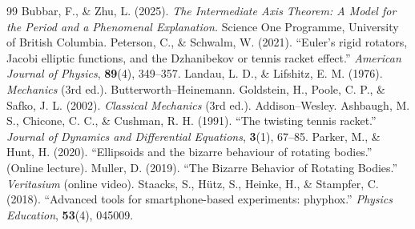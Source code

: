 \documentclass[11pt,letterpaper]{article}
\begin{document}
\begin{thebibliography}{99}
Bubbar, F., \& Zhu, L. (2025).
\textit{The Intermediate Axis Theorem: A Model for the Period and a Phenomenal
Explanation.} Science One Programme, University of British Columbia.
Peterson, C., \& Schwalm, W. (2021).
``Euler's rigid rotators, Jacobi elliptic functions, and the Dzhanibekov or
tennis racket effect.'' \textit{American Journal of Physics}, \textbf{89}(4),
349--357.
Landau, L. D., \& Lifshitz, E. M. (1976).
\textit{Mechanics} (3rd ed.). Butterworth--Heinemann.
Goldstein, H., Poole, C. P., \& Safko, J. L. (2002).
\textit{Classical Mechanics} (3rd ed.). Addison--Wesley.
Ashbaugh, M. S., Chicone, C. C., \& Cushman, R. H. (1991).
``The twisting tennis racket.'' \textit{Journal of Dynamics and Differential
Equations}, \textbf{3}(1), 67--85.
Parker, M., \& Hunt, H. (2020).
``Ellipsoids and the bizarre behaviour of rotating bodies.'' (Online lecture).
Muller, D. (2019).
``The Bizarre Behavior of Rotating Bodies.'' \textit{Veritasium} (online video).
Staacks, S., H\"utz, S., Heinke, H., \& Stampfer, C. (2018).
``Advanced tools for smartphone-based experiments: phyphox.''
\textit{Physics Education}, \textbf{53}(4), 045009.
\end{thebibliography}
\end{document}
